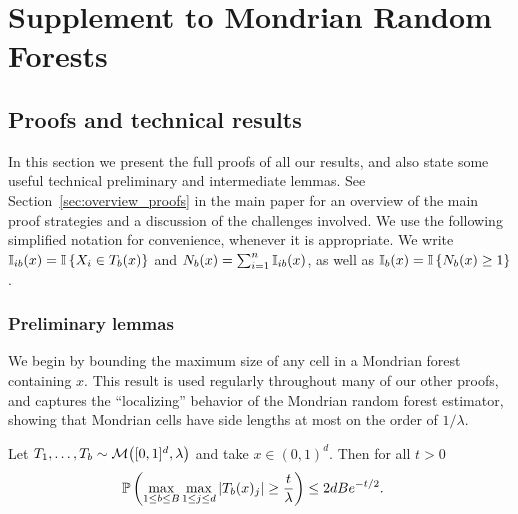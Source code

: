 
\chapter{Supplement to Mondrian Random Forests}
\label{app:mondrian}

\section{Proofs and technical results}%
\label{sec:mondrian_proofs}

In this section we present the full proofs of all our results,
and also state some useful technical preliminary and
intermediate lemmas.
See Section~\ref{sec:overview_proofs} in the main paper
for an overview of the main proof strategies and a discussion of
the challenges involved.
We use the following simplified notation for convenience,
whenever it is appropriate.
We write $\I_{i b}(x) = \I \left\{ X_i \in T_b(x) \right\}$
and $N_b(x) = \sum_{i=1}^{n} \I_{i b}(x)$,
as well as $\I_b(x) = \I \left\{ N_b(x) \geq 1 \right\}$.

\subsection{Preliminary lemmas}

We begin by bounding the maximum size of any cell
in a Mondrian forest containing $x$.
This result is used regularly throughout many of our other proofs,
and captures the ``localizing'' behavior of the Mondrian random
forest estimator, showing that Mondrian cells have side lengths
at most on the order of $1/\lambda$.

\begin{lemma}%
  \label{lem:largest_cell}
  Let $T_1, \ldots, T_b \sim \cM\big([0,1]^d, \lambda\big)$
  and take $x \in (0,1)^d$. Then for all $t > 0$
  \begin{align*}
    \P \left(
      \max_{1 \leq b \leq B}
      \max_{1 \leq j \leq d}
      |T_b(x)_j|
      \geq \frac{t}{\lambda}
    \right)
    &\leq
    2dB e^{-t/2}.
  \end{align*}

\end{lemma}

